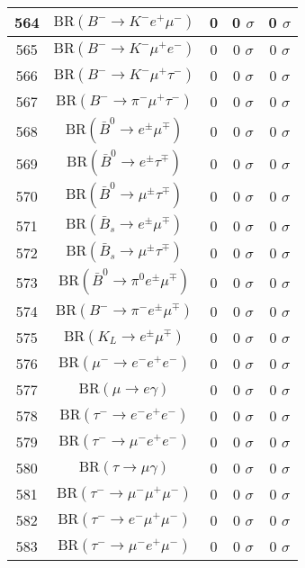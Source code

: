 \begin{longtable}{|c|c|c|c|c|}
564 &	 $\mathrm{BR}(B^-\to K^- e^+\mu^-)$ &	 0 &	 0 $ \sigma$ &	 0 $ \sigma$ \\ \hline
565 &	 $\mathrm{BR}(B^-\to K^- \mu^+e^-)$ &	 0 &	 0 $ \sigma$ &	 0 $ \sigma$ \\ \hline
566 &	 $\mathrm{BR}(B^-\to K^- \mu^+\tau^-)$ &	 0 &	 0 $ \sigma$ &	 0 $ \sigma$ \\ \hline
567 &	 $\mathrm{BR}(B^-\to \pi^- \mu^+\tau^-)$ &	 0 &	 0 $ \sigma$ &	 0 $ \sigma$ \\ \hline
568 &	 $\mathrm{BR}(\bar B^0\to e^\pm \mu^\mp)$ &	 0 &	 0 $ \sigma$ &	 0 $ \sigma$ \\ \hline
569 &	 $\mathrm{BR}(\bar B^0\to e^\pm \tau^\mp)$ &	 0 &	 0 $ \sigma$ &	 0 $ \sigma$ \\ \hline
570 &	 $\mathrm{BR}(\bar B^0\to \mu^\pm \tau^\mp)$ &	 0 &	 0 $ \sigma$ &	 0 $ \sigma$ \\ \hline
571 &	 $\mathrm{BR}(\bar B_s\to e^\pm \mu^\mp)$ &	 0 &	 0 $ \sigma$ &	 0 $ \sigma$ \\ \hline
572 &	 $\mathrm{BR}(\bar B_s\to \mu^\pm \tau^\mp)$ &	 0 &	 0 $ \sigma$ &	 0 $ \sigma$ \\ \hline
573 &	 $\mathrm{BR}(\bar B^0\to \pi^0 e^\pm\mu^\mp)$ &	 0 &	 0 $ \sigma$ &	 0 $ \sigma$ \\ \hline
574 &	 $\mathrm{BR}(B^-\to \pi^- e^\pm\mu^\mp)$ &	 0 &	 0 $ \sigma$ &	 0 $ \sigma$ \\ \hline
575 &	 $\mathrm{BR}(K_L\to e^\pm\mu^\mp)$ &	 0 &	 0 $ \sigma$ &	 0 $ \sigma$ \\ \hline
576 &	 $\mathrm{BR}(\mu^-\to e^-e^+e^-)$ &	 0 &	 0 $ \sigma$ &	 0 $ \sigma$ \\ \hline
577 &	 $\mathrm{BR}(\mu\to e\gamma)$ &	 0 &	 0 $ \sigma$ &	 0 $ \sigma$ \\ \hline
578 &	 $\mathrm{BR}(\tau^-\to e^-e^+e^-)$ &	 0 &	 0 $ \sigma$ &	 0 $ \sigma$ \\ \hline
579 &	 $\mathrm{BR}(\tau^-\to \mu^-e^+e^-)$ &	 0 &	 0 $ \sigma$ &	 0 $ \sigma$ \\ \hline
580 &	 $\mathrm{BR}(\tau\to \mu\gamma)$ &	 0 &	 0 $ \sigma$ &	 0 $ \sigma$ \\ \hline
581 &	 $\mathrm{BR}(\tau^-\to \mu^-\mu^+\mu^-)$ &	 0 &	 0 $ \sigma$ &	 0 $ \sigma$ \\ \hline
582 &	 $\mathrm{BR}(\tau^-\to e^-\mu^+\mu^-)$ &	 0 &	 0 $ \sigma$ &	 0 $ \sigma$ \\ \hline
583 &	 $\mathrm{BR}(\tau^-\to \mu^-e^+\mu^-)$ &	 0 &	 0 $ \sigma$ &	 0 $ \sigma$ \\ \hline

\end{longtable}
